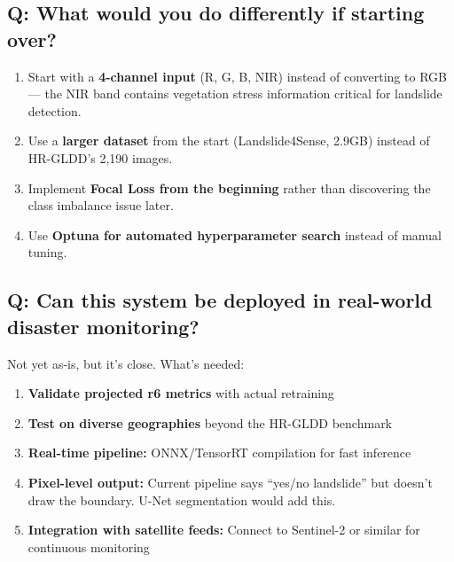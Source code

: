 \documentclass[11pt]{article}
\begin{document}
\subsection{Q: What would you do differently if starting over?}

\begin{enumerate}[noitemsep]
    \item Start with a \textbf{4-channel input} (R, G, B, NIR) instead of converting to RGB --- the NIR band contains vegetation stress information critical for landslide detection.
    \item Use a \textbf{larger dataset} from the start (Landslide4Sense, 2.9GB) instead of HR-GLDD's 2,190 images.
    \item Implement \textbf{Focal Loss from the beginning} rather than discovering the class imbalance issue later.
    \item Use \textbf{Optuna for automated hyperparameter search} instead of manual tuning.
\end{enumerate}

\subsection{Q: Can this system be deployed in real-world disaster monitoring?}

Not yet as-is, but it's close. What's needed:
\begin{enumerate}[noitemsep]
    \item \textbf{Validate projected r6 metrics} with actual retraining
    \item \textbf{Test on diverse geographies} beyond the HR-GLDD benchmark
    \item \textbf{Real-time pipeline:} ONNX/TensorRT compilation for fast inference
    \item \textbf{Pixel-level output:} Current pipeline says ``yes/no landslide'' but doesn't draw the boundary. U-Net segmentation would add this.
    \item \textbf{Integration with satellite feeds:} Connect to Sentinel-2 or similar for continuous monitoring
\end{enumerate}
\end{document}
